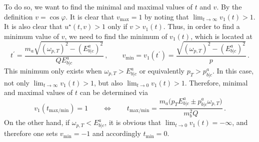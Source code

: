 To do so, we want to find the minimal and maximal values of $t$ and $v$. By the definition ${v=\cos\varphi}$. It is clear that ${v_{\text{max}}=1}$ by noting that ${\lim_{t\to\infty}v_1(t)>1}$. It is also clear that ${u^\star(t,v)>1}$ only if ${v>v_1(t)}$. Thus, in order to find a minimum value of $v$, we need to find the minimum of $v_1(t)$, which is located at
\begin{equation}
    t^\prime=\frac{m_a\sqrt{(\omega_{p,T})^2-(E^a_{b\vert c})^2}}{QE^a_{b\vert c}}\,,\qquad v_{\text{min}}=v_1(t^\prime)=\frac{\sqrt{(\omega_{p,T})^2-(E^a_{b\vert c})^2}}{p}\,.
    \label{eq:Cubature_vmin}
\end{equation}
This minimum only exists when ${\omega_{p,T}>E^a_{b\vert c}}$ or equivalently ${p_T>p^a_{b\vert c}}$. In this case, not only ${\lim_{t\to\infty}v_1(t)>1}$, but also ${\lim_{t\to0}v_1(t)>1}$. Therefore, minimal and maximal values of $t$ can be determined via
\begin{equation}
    v_1(t_{\text{max/min}})=1\qquad\iff\qquad t_{\text{max/min}}=\frac{m_a\big(p_TE^a_{b\vert c}\pm p^a_{b\vert c}\omega_{p,T}\big)}{m_b^2Q}\,.
    \label{eq:Cubature_tminmax}
\end{equation}
On the other hand, if ${\omega_{p,T}<E^a_{b\vert c}}$, it is obvious that ${\lim_{t\to0}v_1(t)=-\infty}$, and therefore one sets ${v_{\text{min}}=-1}$ and accordingly ${t_{\text{min}}=0}$.

